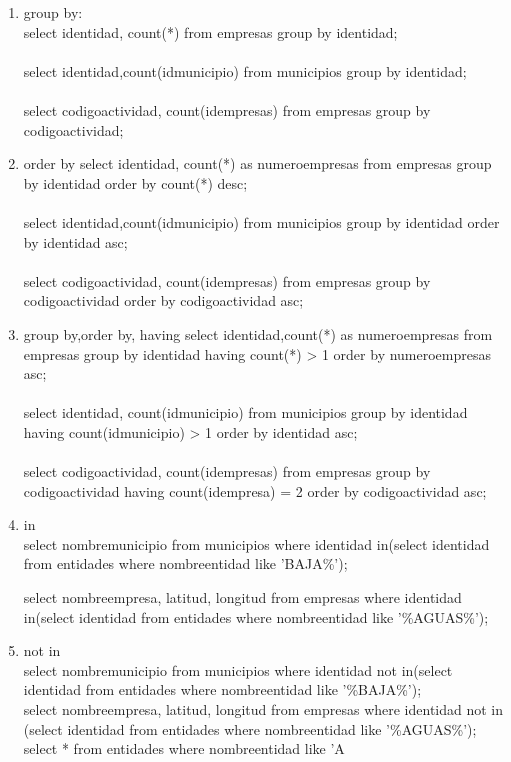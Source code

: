 \documentclass[10pt]{article}         %
\begin{document}
\begin{enumerate}
\item
group by:\\
select identidad, count(*) from empresas group by identidad;\\
\\
select identidad,count(idmunicipio) from municipios group by identidad;\\
\\
select codigoactividad, count(idempresas) from empresas group by codigoactividad;


\item
order by
select identidad, count(*) as numeroempresas from empresas group by identidad order by count(*) desc;\\
\\
select identidad,count(idmunicipio) from municipios group by identidad order by identidad asc;\\
\\
select codigoactividad, count(idempresas) from empresas group by codigoactividad order by codigoactividad asc;

\item 
group by,order by, having
select identidad,count(*) as numeroempresas from empresas group by identidad having count(*) > 1 order by numeroempresas asc;\\
\\
select identidad, count(idmunicipio) from municipios group by identidad having count(idmunicipio) > 1 order by identidad asc;\\
\\
select codigoactividad, count(idempresas) from empresas group by codigoactividad having count(idempresa) = 2 order by codigoactividad asc;

\item in\\
select nombremunicipio from municipios where identidad in(select identidad from entidades where nombreentidad like 'BAJA\%');

select nombreempresa, latitud, longitud from empresas where identidad in(select identidad from entidades where nombreentidad like '\%AGUAS\%');

\item not in\\
	select nombremunicipio from municipios where identidad not in(select identidad from entidades where nombreentidad like '\%BAJA\%');
	\\
	select nombreempresa, latitud, longitud from empresas where identidad not in (select identidad from entidades where nombreentidad like '\%AGUAS\%');
\\
select * from entidades where nombreentidad like 'A%

\end{enumerate}
\end{document}
